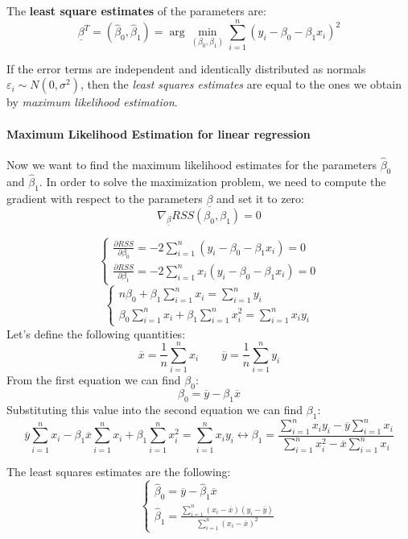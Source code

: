 The \textbf{least square estimates} of the parameters are:
\[
    \underline{\beta}^T = \left(\hat{\beta}_0, \hat{\beta}_1\right) = \arg\min_{(\beta_0, \beta_1)} \sum_{i=1}^{n} (y_i - \beta_0 - \beta_1 x_i)^2
\]

If the error terms are independent and identically distributed as normals $\varepsilon_i \sim N(0, \sigma^2)$, then the \textit{least squares estimates} are equal to the ones we obtain by \textit{maximum likelihood estimation}.

\paragraph*{Maximum Likelihood Estimation for linear regression}




Now we want to find the maximum likelihood estimates for the parameters $\hat{\beta}_0$ and $\hat{\beta}_1$. In order to solve the maximization problem, we need to compute the gradient with respect to the parameters $\underline{\beta}$ and set it to zero:
\[
    \nabla_{\underline{\beta}} RSS(\beta_0, \beta_1) = 0
\]

\[
    \begin{cases}
        \frac{\partial RSS}{\partial \beta_0} = -2 \sum_{i=1}^{n} (y_i - \beta_0 - \beta_1 x_i) = 0 \\
        \frac{\partial RSS}{\partial \beta_1} =   -2 \sum_{i=1}^{n} x_i (y_i - \beta_0 - \beta_1 x_i) = 0
    \end{cases}
\]
\[
    \begin{cases}
        n\beta_0 + \beta_1 \sum_{i=1}^n x_i = \sum_{i=1}^{n} y_i \\
        \beta_0 \sum_{i=1}^n x_i + \beta_1 \sum_{i=1}^n x_i^2 = \sum_{i=1}^{n} x_i y_i
    \end{cases}
\]
Let's define the following quantities:
\[
    \overline{x} = \frac{1}{n} \sum_{i=1}^n x_i
    \qquad
    \overline{y} = \frac{1}{n} \sum_{i=1}^n y_i
\]
From the first equation we can find $\beta_0$:
\[
    \beta_0 = \overline{y} - \beta_1 \overline{x}
\]
Substituting this value into the second equation we can find $\beta_1$:
\[
    \overline{y} \sum_{i=1}^n x_i - \beta_1 \overline{x} \sum_{i=1}^n x_i + \beta_1 \sum_{i=1}^n x_i^2 = \sum_{i=1}^{n} x_i y_i \leftrightarrow \beta_1 = \frac{\sum_{i=1}^{n} x_i y_i - \overline{y} \sum_{i=1}^n x_i}{\sum_{i=1}^n x_i^2 - \overline{x} \sum_{i=1}^n x_i}
\]

The least squares estimates are the following:
\[
    \begin{cases}
        \hat{\beta}_0 = \overline{y} - \hat{\beta}_1 \overline{x} \\
        \hat{\beta}_1 = \frac{\sum_{i=1}^{n} (x_i - \overline{x})(y_i - \overline{y})}{\sum_{i=1}^n (x_i - \overline{x})^2}
    \end{cases}
\]

